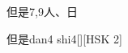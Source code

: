 \begin{entry}{但是}{7,9}{⼈、⽇}
  \begin{phonetics}{但是}{dan4 shi4}[][HSK 2]
  \end{phonetics}
\end{entry}
